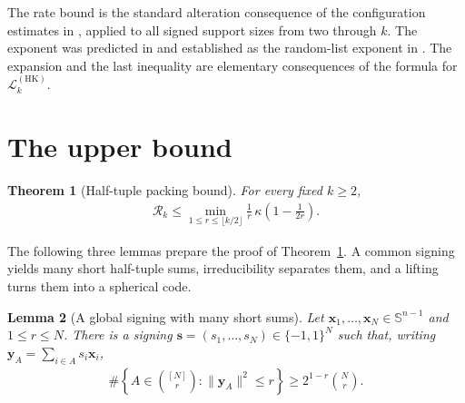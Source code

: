 \documentclass[pdflatex,sn-mathphys-num]{sn-jnl}
\theoremstyle{thmstyleone}
\newtheorem{theorem}{Theorem}[section]
\newtheorem{lemma}[theorem]{Lemma}
\theoremstyle{thmstyletwo}
\newcommand{\Rrate}{\mathcal{R}}
\newcommand{\Lrate}{\mathcal{L}}
\newcommand{\vx}{\mathbf{x}}
\newcommand{\vy}{\mathbf{y}}
\newcommand{\vs}{\mathbf{s}}
\newcommand{\sph}{\mathbb S}
\newcommand{\norm}[1]{\lVert#1\rVert}
\newcommand{\HK}{\mathrm{HK}}
\begin{document}
The rate bound is the standard alteration consequence of the configuration estimates in \cite[Corollary~1, based on Theorems~1--2]{HK17}, applied to all signed support sizes from two through $k$. The exponent was predicted in \cite[Eq.~(3.2)]{BLS16} and established as the random-list exponent in \cite[Theorem~3]{HK17}. The expansion and the last inequality are elementary consequences of the formula for $\Lrate_k^{(\HK)}$.


\section{The upper bound}
\label{sec:upper}

\begin{theorem}[Half-tuple packing bound]
\label{thm:upper}
For every fixed $k\ge2$,
\begin{align}\label{eq:main-upper}
 \Rrate_k \le \min_{1\le r\le\lfloor k/2\rfloor} \frac{1}{r} \, \kappa\!\left(1-\frac1{2r}\right).
\end{align}
\end{theorem}

The following three lemmas prepare the proof of Theorem~\ref{thm:upper}. A common signing yields many short half-tuple sums, irreducibility separates them, and a lifting turns them into a spherical code. 

\begin{lemma}[A global signing with many short sums]\label{lem:signing}
Let $\vx_1,\ldots,\vx_N\in\sph^{n-1}$ and $1\le r\le N$. There is a signing $\vs=(s_1,\ldots,s_N)\in\{-1,1\}^N$ such that, writing $\vy_A=\sum_{i\in A}s_i\vx_i$,
\begin{align}\label{eq:short-sums}
 \#\left\{A\in\binom{[N]}r:\norm{\vy_A}^2\le r\right\}
 \ge2^{1-r}\binom Nr.
\end{align}
\end{lemma}
\end{document}
